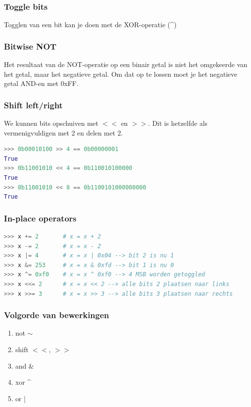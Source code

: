 \documentclass{article}
\begin{document}
\subsubsection{Toggle bits}
Togglen van een bit kan je doen met de XOR-operatie (\textasciicircum{})

\subsubsection{Bitwise NOT}
Het resultaat van de NOT-operatie op een binair getal is niet het omgekeerde van het getal, 
maar het negatieve getal. Om dat op te lossen moet je het negatieve getal AND-en met 0xFF.

\subsubsection{Shift left/right}
We kunnen bits opschuiven met $<<$ en $>>$. Dit is hetzelfde als vermenigvuldigen met 2 en delen met 2.

\begin{lstlisting}[language=Python]
>>> 0b00010100 >> 4 == 0b00000001
True
>>> 0b11001010 << 4 == 0b110010100000
True
>>> 0b11001010 << 8 == 0b1100101000000000
True
\end{lstlisting}

\subsubsection{In-place operators}
\begin{lstlisting}[language=Python]
>>> x += 2       # x = x + 2
>>> x -= 2       # x = x - 2
>>> x |= 4       # x = x | 0x04 --> bit 2 is nu 1
>>> x &= 253     # x = x & 0xfd --> bit 1 is nu 0
>>> x ^= 0xf0    # x = x ^ 0xf0 --> 4 MSB worden getoggled
>>> x <<= 2      # x = x << 2 --> alle bits 2 plaatsen naar links
>>> x >>= 3      # x = x >> 3 --> alle bits 3 plaatsen naar rechts
\end{lstlisting}

\subsubsection{Volgorde van bewerkingen}
\begin{enumerate}
    \item not $\sim$
    \item shift $<<$, $>>$
    \item and \&
    \item xor \textasciicircum{}
    \item or |
\end{enumerate}
\end{document}

